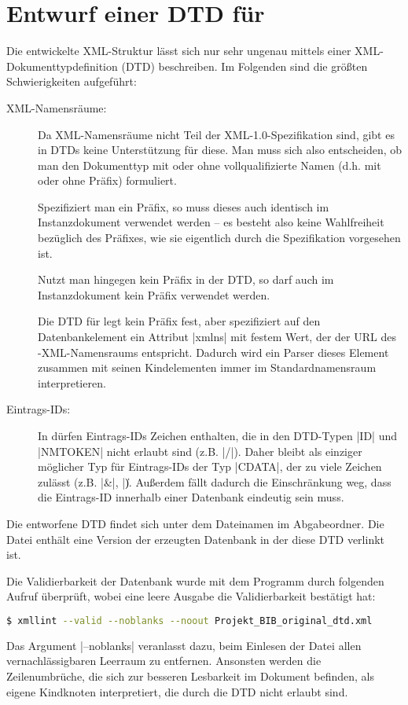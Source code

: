 \section[Entwurf einer DTD]{Entwurf einer DTD für \BibTeXXML}

Die entwickelte XML-Struktur lässt sich nur sehr ungenau mittels einer XML-Dokumenttypdefinition (DTD) beschreiben. Im Folgenden sind die größten Schwierigkeiten aufgeführt:

\begin{description}
    \item[XML-Namensräume:] Da XML-Namensräume nicht Teil der
        XML-1.0-Spezifikation sind, gibt es in DTDs keine Unterstützung für
        diese. Man muss sich also entscheiden, ob man den Dokumenttyp mit oder
        ohne vollqualifizierte Namen (d.h. mit oder ohne Präfix) formuliert.
        
        Spezifiziert man ein Präfix, so muss dieses auch identisch im
        Instanzdokument verwendet werden -- es besteht also keine Wahlfreiheit
        bezüglich des Präfixes, wie sie eigentlich durch die Spezifikation
        \cite{w3c:xml-namespaces} vorgesehen ist.
        
        Nutzt man hingegen kein Präfix in der DTD, so darf auch im
        Instanzdokument kein Präfix verwendet werden.
        
        Die DTD für \BibTeXXML{} legt kein Präfix fest, aber spezifiziert auf den Datenbankelement ein
        Attribut \lstinlineXML|xmlns| mit festem Wert, der der URL des
        \mbox{\BibTeX-}XML-Namensraums entspricht. Dadurch wird ein Parser
        dieses Element zusammen mit seinen Kindelementen immer im
        Standardnamensraum \BibTeXXMLnamespace{} interpretieren.
    \item[Eintrags-IDs:] In \BibTeX{} dürfen Eintrags-IDs Zeichen enthalten, die
        in den DTD-Typen \lstinlineplain|ID| und \lstinlineplain|NMTOKEN| nicht
        erlaubt sind (z.B. \lstinlineplain|/|). Daher bleibt als einziger
        möglicher Typ für Eintrags-IDs der Typ \lstinlineplain|CDATA|, der zu
        viele Zeichen zulässt (z.B. \lstinlineplain|&|, \lstinlineplain|\|).
        Außerdem fällt dadurch die Einschränkung weg, dass die Eintrags-ID
        innerhalb einer Datenbank eindeutig sein muss.
\end{description}

Die entworfene DTD findet sich unter dem Dateinamen  im
Abgabeordner. Die Datei  enthält eine Version
der erzeugten Datenbank in der diese DTD verlinkt ist.

Die Validierbarkeit der Datenbank wurde mit dem Programm  durch
folgenden Aufruf überprüft, wobei eine leere Ausgabe die Validierbarkeit bestätigt hat:
\begin{lstlisting}[language=bash]
$ xmllint --valid --noblanks --noout Projekt_BIB_original_dtd.xml
\end{lstlisting}
Das Argument \lstinlinebash|--noblanks| veranlasst  dazu, beim
Einlesen der Datei allen vernachlässigbaren Leerraum zu entfernen. Ansonsten
werden die Zeilenumbrüche, die sich zur besseren Lesbarkeit im Dokument
befinden, als eigene Kindknoten interpretiert, die durch die DTD nicht erlaubt
sind.